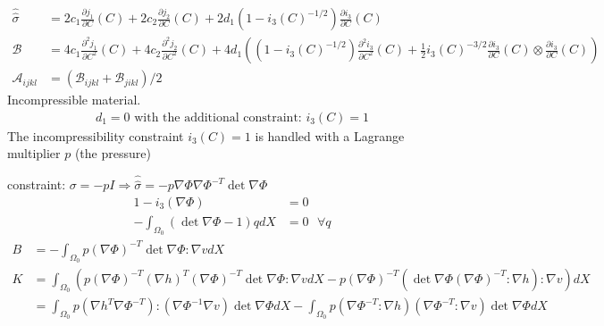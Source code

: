 \documentclass[a4paper,11pt,english]{sphinxmanual}
\begin{document}
\begin{equation*}
\begin{split}{\hat{\hat{\sigma}}}   &= 2c_1 \frac{\partial j_1}{\partial C}(C) + 2c_2 \frac{\partial j_2}{\partial C}(C)  + 2d_1\left(1-i_3(C)^{-1/2}\right)\frac{\partial i_3}{\partial C}(C) \\
\mathcal{B} &= 4 c_1 \frac{\partial^2 j_1}{\partial C^2}(C) + 4c_2 \frac{\partial^2 j_2}{\partial C^2}(C) + 4d_1\left(\left(1-i_3(C)^{-1/2}\right)\frac{\partial^2 i_3}{\partial C^2}(C) + \frac{1}{2}i_3(C)^{-3/2} \frac{\partial i_3}{\partial C}(C) \otimes \frac{\partial i_3}{\partial C}(C)\right) \\
\mathcal{A}_{ijkl} &= (\mathcal{B}_{ijkl} + \mathcal{B}_{jikl})/2\end{split}
\end{equation*}
Incompressible material.
\begin{equation*}
\begin{split}{d_1} = 0
\mbox{ with the additional constraint: }
i_3( C) = 1\end{split}
\end{equation*}
The incompressibility constraint \(i_3( C) = 1\) is handled with a Lagrange multiplier \(p\) (the pressure)

constraint: \(\sigma = -pI \Rightarrow {\hat{\hat{\sigma}}} = -p\nabla\Phi\nabla\Phi^{-T}\det\nabla\Phi\)
\begin{equation*}
\begin{split}1 - i_3(\nabla\Phi) &= 0 \\
-\int_{\Omega_0} (\det\nabla\Phi  -1) q  dX &= 0 ~~~ \forall q\end{split}
\end{equation*}\begin{equation*}
\begin{split}B &= -\int_{\Omega_0} p(\nabla\Phi)^{-T} \det \nabla\Phi : \nabla v  dX \\
K &= \int_{\Omega_0} \left( p(\nabla\Phi)^{-T}(\nabla h)^{T}(\nabla\Phi)^{-T}\det\nabla\Phi : \nabla v  dX -
p(\nabla\Phi)^{-T}(\det \nabla\Phi(\nabla\Phi)^{-T}:\nabla h) : \nabla v \right)  dX\\
&= \int_{\Omega_0} p(\nabla h^T\nabla\Phi^{-T}):(\nabla\Phi^{-1}\nabla v)\det\nabla\Phi dX - \int_{\Omega_0} p(\nabla\Phi^{-T}:\nabla h)(\nabla\Phi^{-T}:\nabla v)\det\nabla\Phi dX\end{split}
\end{equation*}
\end{document}
